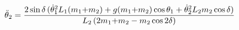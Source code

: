 \documentclass[preview]{standalone}
\begin{document}
\begin{align*}
\special{dvisvgm:raw <g id='unique000'>}\ddot\theta_2 = \frac{2\sin\delta\,(\dot\theta_1^2 L_1(m_1{+}m_2)+ g(m_1{+}m_2)\cos\theta_1+ \dot\theta_2^2 L_2 m_2 \cos\delta)}{L_2\,(2m_1{+}m_2 - m_2\cos 2\delta)}\special{dvisvgm:raw </g>}
\end{align*}
\end{document}
